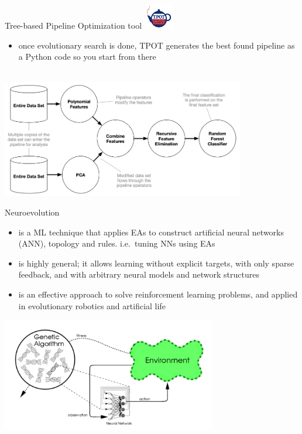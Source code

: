 \begin{frame}{Tree-based Pipeline Optimization tool 
\includegraphics[width=0.1\textwidth]{new_images/TPOT.png}}
\begin{itemize}
    \item once evolutionary search is done, TPOT generates the best found pipeline as a Python code so you start from there \\~\\
\end{itemize}
\centering
\includegraphics[width=0.8\textwidth]{new_images/tpot4.png}\\
\end{frame}

\begin{frame}{Neuroevolution }
\begin{itemize}
    \item is a ML technique that applies EAs to construct artificial neural networks (ANN), topology and rules. i.e.\ tuning NNs using EAs
    \item is highly general; it allows learning without explicit targets, with only sparse feedback, and with arbitrary neural models and network structures
    \item is an effective approach to solve reinforcement learning problems, and applied in evolutionary robotics and artificial life
\end{itemize}
\centering 
\includegraphics[width=0.7\textwidth]{new_images/neuroevo.png}
\end{frame}

